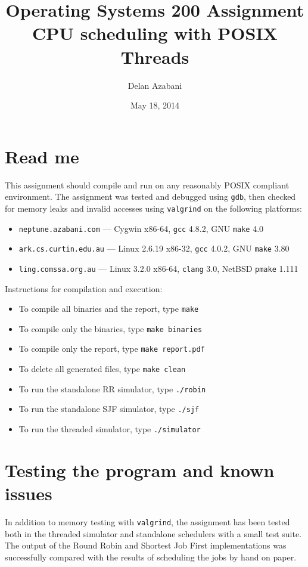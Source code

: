 \documentclass[a4paper,12pt,titlepage]{article}
\title{Operating Systems 200 Assignment\\
       CPU scheduling with POSIX Threads}
\date{May 18, 2014}
\author{Delan Azabani}
\begin{document}
\maketitle

\section{Read me}

This assignment should compile and run on any reasonably POSIX compliant
environment. The assignment was tested and debugged using \texttt{gdb}, then
checked for memory leaks and invalid accesses using \texttt{valgrind} on the
following platforms:

\begin{itemize}
	\item \texttt{neptune.azabani.com} ---
	      Cygwin x86-64,
	      \texttt{gcc} 4.8.2,
	      GNU \texttt{make} 4.0
	\item \texttt{ark.cs.curtin.edu.au} ---
	      Linux 2.6.19 x86-32,
	      \texttt{gcc} 4.0.2,
	      GNU \texttt{make} 3.80
	\item \texttt{ling.comssa.org.au} ---
	      Linux 3.2.0 x86-64,
	      \texttt{clang} 3.0,
	      NetBSD \texttt{pmake} 1.111
\end{itemize}

Instructions for compilation and execution:

\begin{itemize}
	\item To compile all binaries and the report, type \texttt{make}
	\item To compile only the binaries, type \texttt{make binaries}
	\item To compile only the report, type \texttt{make report.pdf}
	\item To delete all generated files, type \texttt{make clean}
	\item To run the standalone RR simulator, type \texttt{./robin}
	\item To run the standalone SJF simulator, type \texttt{./sjf}
	\item To run the threaded simulator, type \texttt{./simulator}
\end{itemize}

\section{Testing the program and known issues}

In addition to memory testing with \texttt{valgrind}, the assignment has been
tested both in the threaded simulator and standalone schedulers with a small
test suite. The output of the Round Robin and Shortest Job First
implementations was successfully compared with the results of scheduling the
jobs by hand on paper.
\end{document}
